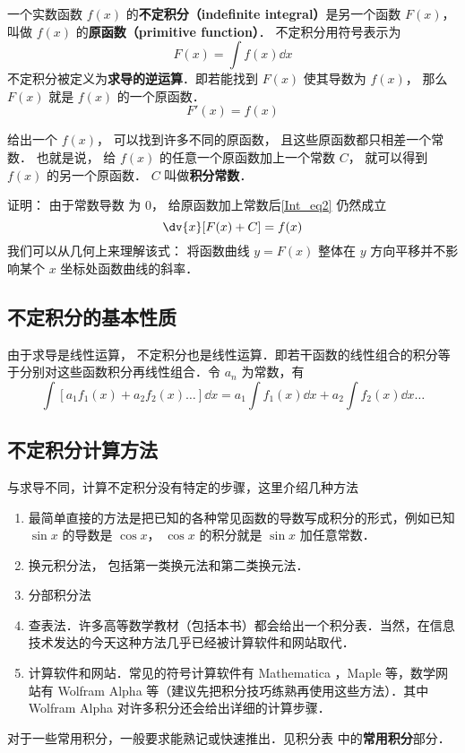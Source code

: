 

一个实数函数 $f(x)$ 的\textbf{不定积分（indefinite integral）}是另一个函数 $F(x)$， 叫做 $f(x)$ 的\textbf{原函数（primitive function）}． 不定积分用符号表示为
\begin{equation}\label{Int_eq1}
F(x) = \int f(x) \dd{x} 
\end{equation}
不定积分被定义为\textbf{求导的逆运算}．即若能找到 $F(x)$ 使其导数为 $f(x)$， 那么 $F(x)$ 就是  $f(x)$ 的一个原函数．
\begin{equation}\label{Int_eq2}
F'(x) = f(x)
\end{equation}

给出一个 $f(x)$， 可以找到许多不同的原函数， 且这些原函数都只相差一个常数． 也就是说， 给 $f(x)$ 的任意一个原函数加上一个常数 $C$， 就可以得到 $f(x)$ 的另一个原函数． $C$ 叫做\textbf{积分常数}．

证明： 由于常数导数%
为 $0$， 给原函数加上常数后\autoref{Int_eq2} 仍然成立
\begin{equation}\label{Int_eq3}
\dv{x} [F(x) + C] = f(x)
\end{equation}
我们可以从几何上来理解该式： 将函数曲线 $y = F(x)$ 整体在 $y$ 方向平移并不影响某个 $x$ 坐标处函数曲线的斜率．

\subsection{不定积分的基本性质}%

由于求导是线性运算，%
不定积分也是线性运算．即若干函数的线性组合的积分等于分别对这些函数积分再线性组合．令 $a_n$ 为常数，有
\begin{equation}\label{Int_eq4}
\int [a_1 f_1(x) + a_2 f_2(x)\dots] \dd{x}  = a_1 \int f_1(x) \dd{x} + a_2 \int f_2(x) \dd{x} \dots
\end{equation}

\subsection{不定积分计算方法}
与求导不同，计算不定积分没有特定的步骤，这里介绍几种方法
\begin{enumerate}
\item 最简单直接的方法是把已知的各种常见函数的导数写成积分的形式，例如已知 $\sin x$ 的导数是 $\cos x$， $\cos x$ 的积分就是 $\sin x$ 加任意常数．
\item 换元积分法， 包括第一类换元法和第二类换元法．

\item 分部积分法

\item 查表法．许多高等数学教材（包括本书）都会给出一个积分表．当然，在信息技术发达的今天这种方法几乎已经被计算软件和网站取代．

\item 计算软件和网站．常见的符号计算软件有 Mathematica %
，Maple 等，数学网站有 Wolfram Alpha %
等（建议先把积分技巧练熟再使用这些方法）．其中 Wolfram Alpha 对许多积分还会给出详细的计算步骤．
 \end{enumerate}

对于一些常用积分，一般要求能熟记或快速推出．见积分表 中的\textbf{常用积分}部分．%



